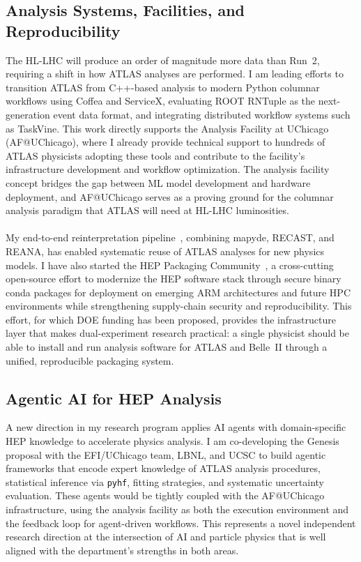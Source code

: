 \documentclass[10pt,a4paper,sans]{moderncv} %
\begin{document}
\subsection{Analysis Systems, Facilities, and Reproducibility}
The HL-LHC will produce an order of magnitude more data than Run~2, requiring a shift in how ATLAS analyses are performed. I am leading efforts to transition ATLAS from C++-based analysis to modern Python columnar workflows using Coffea and ServiceX, evaluating ROOT RNTuple as the next-generation event data format, and integrating distributed workflow systems such as TaskVine. This work directly supports the Analysis Facility at UChicago (AF@UChicago), where I already provide technical support to hundreds of ATLAS physicists adopting these tools and contribute to the facility's infrastructure development and workflow optimization. The analysis facility concept bridges the gap between ML model development and hardware deployment, and AF@UChicago serves as a proving ground for the columnar analysis paradigm that ATLAS will need at HL-LHC luminosities.
\\
\\
My end-to-end reinterpretation pipeline~\cite{10.21468/SciPostPhysCodeb.27}, combining mapyde, RECAST, and REANA, has enabled systematic reuse of ATLAS analyses for new physics models. I have also started the HEP Packaging Community~\cite{HEPPackaging2025}, a cross-cutting open-source effort to modernize the HEP software stack through secure binary conda packages for deployment on emerging ARM architectures and future HPC environments while strengthening supply-chain security and reproducibility. This effort, for which DOE funding has been proposed, provides the infrastructure layer that makes dual-experiment research practical: a single physicist should be able to install and run analysis software for ATLAS and Belle~II through a unified, reproducible packaging system.

\subsection{Agentic AI for HEP Analysis}
A new direction in my research program applies AI agents with domain-specific HEP knowledge to accelerate physics analysis. I am co-developing the Genesis proposal with the EFI/UChicago team, LBNL, and UCSC to build agentic frameworks that encode expert knowledge of ATLAS analysis procedures, statistical inference via \texttt{pyhf}, fitting strategies, and systematic uncertainty evaluation. These agents would be tightly coupled with the AF@UChicago infrastructure, using the analysis facility as both the execution environment and the feedback loop for agent-driven workflows. This represents a novel independent research direction at the intersection of AI and particle physics that is well aligned with the department's strengths in both areas.
\end{document}
